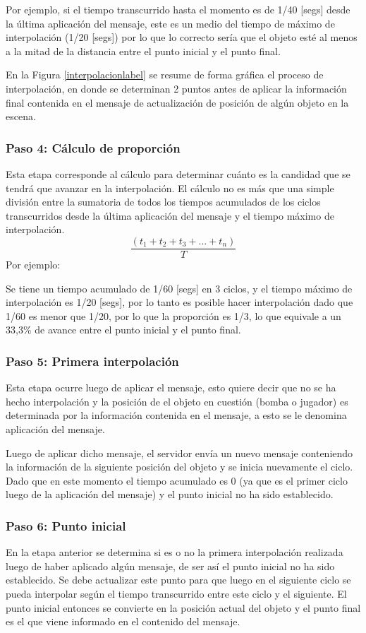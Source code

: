 \documentclass[a4paper,12pt,openany,oneside]{book}
\begin{document}
Por ejemplo, si el tiempo transcurrido hasta el momento es de 1/40 [segs] desde la última aplicación del mensaje, este es un medio del tiempo de máximo de interpolación (1/20 [segs]) por lo que lo correcto sería que el objeto esté al menos a la mitad de la distancia entre el punto inicial y el punto final.

En la Figura \ref{interpolacionlabel} se resume de forma gráfica el proceso de interpolación, en donde se determinan 2 puntos antes de aplicar la información final contenida en el mensaje de actualización de posición de algún objeto en la escena.
\subsubsection{Paso 4: Cálculo de proporción}
Esta etapa corresponde al cálculo para determinar cuánto es la candidad que se tendrá que avanzar en la interpolación. El cálculo no es más que una simple división entre la sumatoria de todos los tiempos acumulados de los ciclos transcurridos desde la última aplicación del mensaje y el tiempo máximo de interpolación.
$$\frac{(t_1 + t_2 + t_3 + ... + t_n )}{T}$$
Por ejemplo:

Se tiene un tiempo acumulado de 1/60 [segs] en 3 ciclos, y el tiempo máximo de interpolación es 1/20 [segs], por lo tanto es posible hacer interpolación dado que 1/60 es menor que 1/20, por lo que la proporción es 1/3, lo que equivale a un 33,3\% de avance entre el punto inicial y el punto final.
\subsubsection{Paso 5: Primera interpolación}
Esta etapa ocurre luego de aplicar el mensaje, esto quiere decir que no se ha hecho interpolación y la posición de el objeto en cuestión (bomba o jugador) es determinada por la información contenida en el mensaje, a esto se le denomina aplicación del mensaje.

Luego de aplicar dicho mensaje, el servidor envía un nuevo mensaje conteniendo la información de la siguiente posición del objeto y se inicia nuevamente el ciclo. Dado que en este momento el tiempo acumulado es 0 (ya que es el primer ciclo luego de la aplicación del mensaje) y el punto inicial no ha sido establecido.
\subsubsection{Paso 6: Punto inicial}
En la etapa anterior se determina si es o no la primera interpolación realizada luego de haber aplicado algún mensaje, de ser así el punto inicial no ha sido establecido. Se debe actualizar este punto para que luego en el siguiente ciclo se pueda interpolar según el tiempo transcurrido entre este ciclo y el siguiente. El punto inicial entonces se convierte en la posición actual del objeto y el punto final es el que viene informado en el contenido del mensaje.
\end{document}
